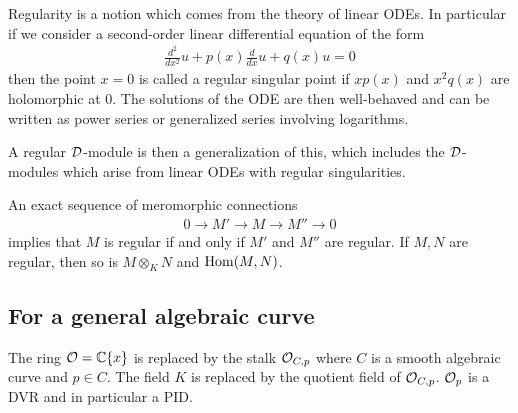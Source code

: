 \begin{remark}
	Regularity is a notion which comes from the theory of linear ODEs. In particular
	if we consider a second-order linear differential equation of the form \begin{align*}
		\frac{d^2}{dx^2}u + p(x)\frac{d}{dx}u + q(x)u = 0
	\end{align*} then the point $x=0$ is called a regular singular point if $xp(x)$ and $x^2q(x)$
	are holomorphic at $0$. The solutions of the ODE are then well-behaved
	and can be written as power series or generalized series involving logarithms.

	\hfill

	A regular ${\mathcal{D}}$-module is then a generalization of this, which includes the ${\mathcal{D}}$-modules
	which arise from linear ODEs with regular singularities.
\end{remark}

\begin{proposition}
	An exact sequence of meromorphic connections \begin{align*}
		0 \to M' \to M \to M'' \to 0
	\end{align*} implies that $M$ is regular if and only if $M'$ and $M''$ are regular.
	If $M,N$ are regular, then so is $M\otimes_K N$ and $\operatorname{Hom}(M,N)$.
\end{proposition}
\subsection{For a general algebraic curve}
The ring ${\mathcal{O}} = \mathbb{C}\{x\}$ is replaced by the stalk ${\mathcal{O}}_{C,p}$
where $C$ is a smooth algebraic curve and $p\in C$. The field $K$ is replaced by the
quotient field of ${\mathcal{O}}_{C,p}$. ${\mathcal{O}}_p$ is a DVR and in particular a PID.

